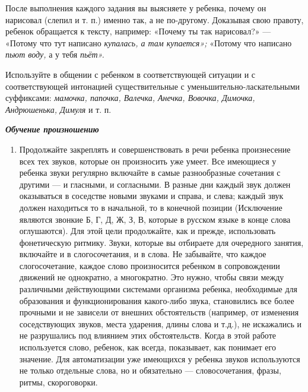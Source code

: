\documentclass[a5paper]{book}
\renewcommand{\emph}[1]{\textit{#1}}
\begin{document}
После выполнения каждого задания вы выясняете у ребенка, почему он
нарисовал (слепил и т. п.) именно так, а не по-другому. Доказывая свою
правоту, ребенок обращается к тексту, например: «Почему ты так
нарисовал?» --- «Потому что тут написано \emph{купалась, а там
купается»;} «Потому что написано \emph{пьют воду,} а у тебя
\emph{пьёт».}

Используйте в общении с ребенком в соответствующей ситуации и с
соответствующей интонацией существительные с уменьшительно-ласкательными
суффиксами: \emph{мамочка, папочка, Валечка, Анечка, Вовочка, Димочка,
Андрюшенька, Димуля} и т. п.

\emph{\textbf{Обучение произношению}}


\begin{enumerate}
\def\labelenumi{\arabic{enumi}.}
\item
  
  Продолжайте закреплять и совершенствовать в речи ребенка произнесение
  всех тех звуков, которые он произносить уже умеет. Все имеющиеся у
  ребенка звуки регулярно включайте в самые разнообразные сочетания с
  другими --- и гласными, и согласными. В разные дни каждый звук должен
  оказываться в соседстве новыми звуками и справа, и слева; каждый звук
  должен находиться то в начальной, то в конечной позиции (Исключение
  являются звонкие Б, Г, Д, Ж, З, В, которые в русском языке в конце
  слова оглушаются). Для этой цели продолжайте, как и прежде,
  использовать фонетическую ритмику. Звуки, которые вы отбираете для
  очередного занятия, включайте и в слогосочетания, и в слова. Не
  забывайте, что каждое слогосочетание, каждое слово произносится
  ребенком в сопровождении движений не однократно, а многократно. Это
  нужно, чтобы связи между различными действующими системами организма
  ребенка, необходимые для образования и функционирования какого-либо
  звука, становились все более прочными и не зависели от внешних
  обстоятельств (например, от изменения соседствующих звуков, места
  ударения, длины слова и т.д.), не искажались и не разрушались под
  влиянием этих обстоятельств. Когда в этой работе используется слово,
  ребенок, как всегда, показывает, как понимает его значение. Для
  автоматизации уже имеющихся у ребенка звуков используются не только
  отдельные слова, но и обязательно --- словосочетания, фразы, ритмы,
  скороговорки.
  
\end{enumerate}
\end{document}
